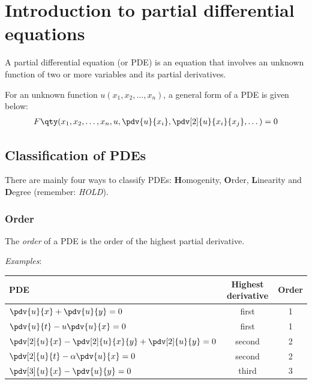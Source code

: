 \section{Introduction to partial differential equations}
    A partial differential equation (or PDE) is an equation that involves an unknown function of two or more variables and its partial derivatives.
    
    For an unknown function $u(x_1,x_2,\dots,x_n)$, a general form of a PDE is given below:
    \begin{align*}
        F\qty(x_1,x_2,\dots,x_n,u,\pdv{u}{x_i},\pdv[2]{u}{x_i}{x_j},\dots)=0
    \end{align*}

    \subsection{Classification of PDEs}
        There are mainly four ways to classify PDEs: \textbf{H}omogenity, \textbf{O}rder, \textbf{L}inearity and \textbf{D}egree (remember: \textit{HOLD}).

        \subsubsection{Order}
            The \textit{order} of a PDE is the order of the highest partial derivative.

            \textit{Examples}:
            \renewcommand{\arraystretch}{2.2}
            \begin{table}[h!]
                \centering
                \begin{tabular}{p{}cc}
                    \toprule[1.5pt]
                    \textbf{PDE} & \textbf{Highest derivative} & \textbf{Order} \\ \midrule[1.5pt]
                    {$\pdv{u}{x}+\pdv{u}{y}=0$} & {first} & {1} \\ %
                    {$\pdv{u}{t}-u\pdv{u}{x}=0$} & {first} & {1} \\ %
                    {$\pdv[2]{u}{x}-\pdv[2]{u}{x}{y}+\pdv[2]{u}{y}=0$} & {second} & {2} \\ %
                    {$\pdv[2]{u}{t}-\alpha\pdv{u}{x}=0$} & {second} & {2} \\ %
                    {$\pdv[3]{u}{x}-\pdv{u}{y}=0$} & {third} & {3} \\
                    \bottomrule[1.5pt]
                \end{tabular}
            \end{table}

